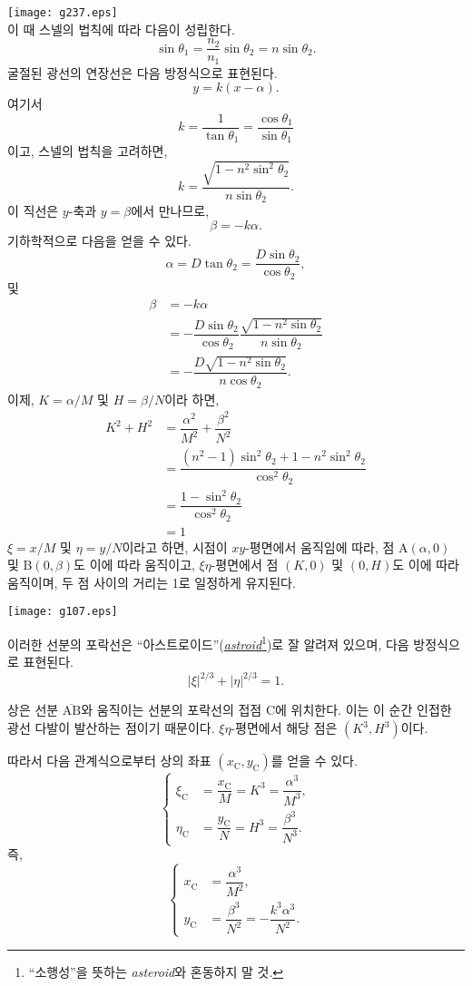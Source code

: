 \documentclass[twocolumn]{article}
\begin{document}
	\texttt{[image: g237.eps]}\\
	이 때 스넬의 법칙에 따라 다음이 성립한다.
	$$ \sin\theta_1 = \frac{n_2}{n_1} \sin\theta_2 = n\sin\theta_2.$$
	굴절된 광선의 연장선은 다음 방정식으로 표현된다.
	$$y=k(x-\alpha).$$
	여기서 
	$$k=\dfrac{1}{\tan\theta_1}=\dfrac{\cos\theta_1}{\sin\theta_1}$$
	이고, 스넬의 법칙을 고려하면,
	$$k=\dfrac{\sqrt{1-n^2\sin^2\theta_2}}{n\sin\theta_2}.$$
	이 직선은 $y$-축과 $y=\beta$에서 만나므로,
	$$\beta = -k\alpha.$$
	기하학적으로 다음을 얻을 수 있다.
	$$\alpha = D\tan\theta_2 = \dfrac{D\sin\theta_2}{\cos\theta_2},$$
	및
	$$\begin{aligned}
		\beta &= -k\alpha \\
		&= -\dfrac{D\sin\theta_2}{\cos\theta_2}
		\dfrac{\sqrt{1-n^2\sin\theta_2}}{n\sin\theta_2}\\
		&=-\dfrac{D\sqrt{1-n^2\sin\theta_2}}{n\cos\theta_2}.
	\end{aligned}$$
	이제, $K=\alpha/M$ 및 $H=\beta/N$이라 하면,
	$$ \begin{aligned}
		K^2 + H^2 &= \dfrac{\alpha^2}{M^2}+\dfrac{\beta^2}{N^2}\\
		&=\dfrac{\left(n^2-1\right)\sin^2\theta_2 + 1-n^2\sin^2\theta_2}
		{\cos^2\theta_2}\\
		&=\dfrac{1-\sin^2\theta_2}{\cos^2\theta_2}\\
		&=1
	\end{aligned}$$
	$\xi=x/M$ 및 $\eta=y/N$이라고 하면, 시점이 $xy$-평면에서 움직임에 따라,
	점 $\mathrm{A}(\alpha, 0)$ 및 $\mathrm{B}(0, \beta)$도 이에 따라 움직이고, 
	$\xi\eta$-평면에서 점 $(K, 0)$ 및 $(0, H)$도 이에 따라 움직이며, 
	두 점 사이의 거리는 1로 일정하게 유지된다.
	
	\texttt{[image: g107.eps]}
	
	이러한 선분의 포락선은 ``아스트로이드''(\href{https://en.wikipedia.org/wiki/Astroid}{\emph{astroid}}\footnote{
		``소행성''을 뜻하는 \emph{asteroid}와 혼동하지 말 것.})로 잘 알려져 있으며, 
	다음 방정식으로 표현된다.
	$$ \left| \xi \right|^{2/3} + \left| \eta \right|^{2/3} = 1. $$
	
	상은 선분 $\overline{\mathrm{AB}}$와 움직이는 선분의 포락선의 접점 $\mathrm{C}$에 위치한다. 
	이는 이 순간 인접한 광선 다발이 발산하는 점이기 때문이다. 
	$\xi\eta$-평면에서 해당 점은 $(K^3, H^3)$이다.
	
	따라서 다음 관계식으로부터 상의 좌표 $(x_{\mathrm{C}}^{}, y_{\mathrm{C}}^{})$를 얻을 수 있다.
	$$ \left\{ 
	\begin{aligned}
		\xi_{\mathrm{C}}^{} &= \dfrac{x_{\mathrm{C}}^{}}{M} = K^3 = \dfrac{\alpha^3}{M^3},\\
		\eta_{\mathrm{C}}^{} &= \dfrac{y_{\mathrm{C}}^{}}{N} = H^3 = \dfrac{\beta^3}{N^3}.
	\end{aligned}
	\right.$$
	즉,
	$$ \left\{ 
	\begin{aligned}
		x_{\mathrm{C}}^{} &= \dfrac{\alpha^3}{M^2},\\
		y_{\mathrm{C}}^{} &= \dfrac{\beta^3}{N^2}=-\dfrac{k^3\alpha^3}{N^2}.
	\end{aligned}
	\right.$$
	
\end{document}

